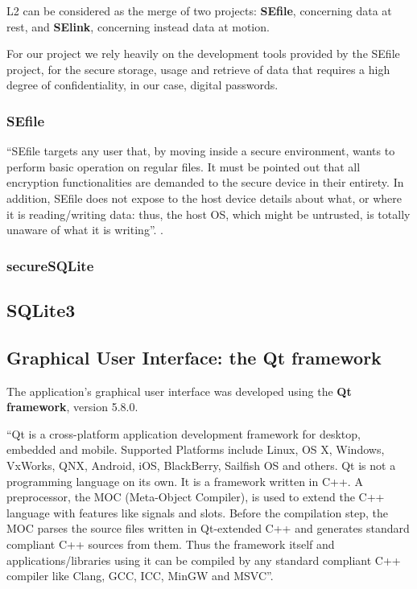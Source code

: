 L2 can be considered as the merge of two projects: \textbf{SEfile}, concerning data at rest, and \textbf{SElink}, concerning instead data at motion.

For our project we rely heavily on the development tools provided by the SEfile project, for the secure storage, usage and retrieve of data that requires a high degree of confidentiality, in our case, digital passwords.

\subsubsection{SEfile}

``SEfile targets any user that, by moving inside a secure environment, wants to perform basic operation on regular files. It must be pointed out that all encryption functionalities are demanded to the secure device in their entirety. In addition, SEfile does not expose to the host device details about what, or where it is reading/writing data: thus, the host OS, which might be untrusted, is totally unaware of what it is writing''. \cite{L2UserMan}.

\subsubsection{secureSQLite}

\subsection{SQLite3}

\subsection{Graphical User Interface: the Qt framework}
The application's graphical user interface was developed using the \textbf{Qt framework}, version 5.8.0. 

``Qt is a cross-platform application development framework for desktop, embedded and mobile. Supported Platforms include Linux, OS X, Windows, VxWorks, QNX, Android, iOS, BlackBerry, Sailfish OS and others. Qt is not a programming language on its own. It is a framework written in C++. A preprocessor, the MOC (Meta-Object Compiler), is used to extend the C++ language with features like signals and slots. Before the compilation step, the MOC parses the source files written in Qt-extended C++ and generates standard compliant C++ sources from them. Thus the framework itself and applications/libraries using it can be compiled by any standard compliant C++ compiler like Clang, GCC, ICC, MinGW and MSVC''.\cite{Qt}  


